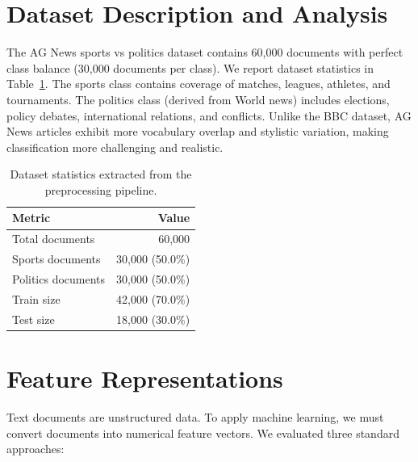 \documentclass[12pt]{article}
\begin{document}
\section{Dataset Description and Analysis}
The AG News sports vs politics dataset contains 60,000 documents with perfect class balance (30,000 documents per class). We report dataset statistics in Table~\ref{tab:data}. The sports class contains coverage of matches, leagues, athletes, and tournaments. The politics class (derived from World news) includes elections, policy debates, international relations, and conflicts. Unlike the BBC dataset, AG News articles exhibit more vocabulary overlap and stylistic variation, making classification more challenging and realistic.

\begin{table}[h]
\centering
\caption{Dataset statistics extracted from the preprocessing pipeline.}
\label{tab:data}
\begin{tabular}{l r}
\toprule
Metric & Value \\
\midrule
Total documents & 60,000 \\
Sports documents & 30,000 (50.0\%) \\
Politics documents & 30,000 (50.0\%) \\
Train size & 42,000 (70.0\%) \\
Test size & 18,000 (30.0\%) \\
\bottomrule
\end{tabular}
\end{table}

\section{Feature Representations}
Text documents are unstructured data. To apply machine learning, we must convert documents into numerical feature vectors. We evaluated three standard approaches:
\end{document}

